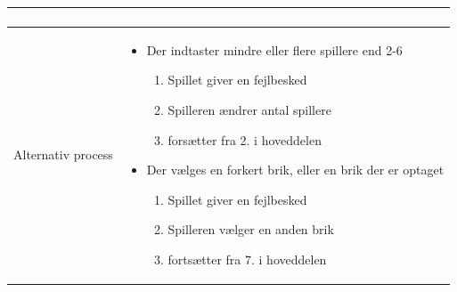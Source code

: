 \begin{center}
\begin{longtable}{|l|p{11cm}|}
\begin{minipage}[t]{1\textwidth}
\begin{enumerate}
  \end{enumerate} 
  \end{minipage}
\\
\hline
Alternativ process & 
\begin{minipage}[t]{1\textwidth}
 \begin{itemize}
 \vspace{0.5cm}
     \item Der indtaster mindre eller flere spillere end 2-6
        \begin{enumerate}
            \item Spillet giver en fejlbesked
            \item Spilleren ændrer antal spillere
            \item forsætter fra 2. i hoveddelen
        \end{enumerate}
    \item Der vælges en forkert brik, eller en brik der er optaget
    \begin{enumerate}
        \item Spillet giver en fejlbesked
        \item Spilleren vælger en anden brik
        \item fortsætter fra 7. i hoveddelen
    \end{enumerate}
 \end{itemize}
\end{minipage}

\\
\hline
\end{longtable}
\end{center}



